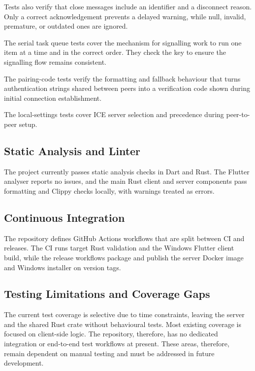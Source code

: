 \documentclass[12pt,a4paper,oneside]{report}
\begin{document}
Tests also verify that close messages include an identifier and a disconnect reason. Only a correct acknowledgement prevents a delayed warning, while null, invalid, premature, or outdated ones are ignored.

The serial task queue tests cover the mechanism for signalling work to run one item at a time and in the correct order. They check the key to ensure the signalling flow remains consistent.

The pairing-code tests verify the formatting and fallback behaviour that turns authentication strings shared between peers into a verification code shown during initial connection establishment.

The local-settings tests cover ICE server selection and precedence during peer-to-peer setup.


\subsection{Static Analysis and Linter}
\label{sec:static-analysis}

The project currently passes static analysis checks in Dart and Rust. The Flutter analyser reports no issues, and the main Rust client and server components pass formatting and Clippy checks locally, with warnings treated as errors.


\subsection{Continuous Integration}
\label{sec:ci}

The repository defines GitHub Actions workflows that are split between CI and releases. The CI runs target Rust validation and the Windows Flutter client build, while the release workflows package and publish the server Docker image and Windows installer on version tags.


\subsection{Testing Limitations and Coverage Gaps}
\label{sec:testing-limitations}

The current test coverage is selective due to time constraints, leaving the server and the shared Rust crate without behavioural tests. Most existing coverage is focused on client-side logic. The repository, therefore, has no dedicated integration or end-to-end test workflows at present. These areas, therefore, remain dependent on manual testing and must be addressed in future development.
\end{document}
